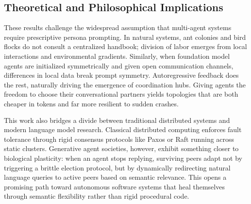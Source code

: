 \documentclass{ieeeaccess}
\begin{document}
\subsection{Theoretical and Philosophical Implications}
These results challenge the widespread assumption that multi-agent systems require prescriptive persona prompting. In natural systems, ant colonies and bird flocks do not consult a centralized handbook; division of labor emerges from local interactions and environmental gradients. Similarly, when foundation model agents are initialized symmetrically and given open communication channels, differences in local data break prompt symmetry. Autoregressive feedback does the rest, naturally driving the emergence of coordination hubs. Giving agents the freedom to choose their conversational partners yields topologies that are both cheaper in tokens and far more resilient to sudden crashes.

This work also bridges a divide between traditional distributed systems and modern language model research. Classical distributed computing enforces fault tolerance through rigid consensus protocols like Paxos or Raft running across static clusters. Generative agent societies, however, exhibit something closer to biological plasticity: when an agent stops replying, surviving peers adapt not by triggering a brittle election protocol, but by dynamically redirecting natural language queries to active peers based on semantic relevance. This opens a promising path toward autonomous software systems that heal themselves through semantic flexibility rather than rigid procedural code.
\end{document}
